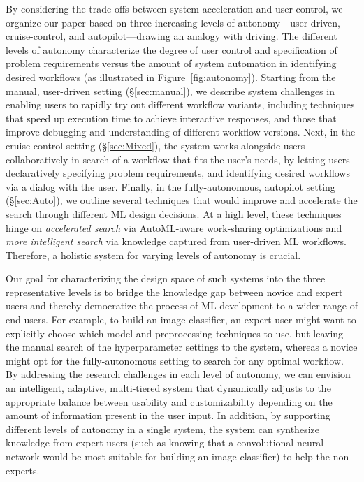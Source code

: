 \documentclass[11pt,dvipdfmx]{article}
\begin{document}
By considering the trade-offs between system acceleration and user control, we
organize our paper based on three increasing levels of autonomy---user-driven, cruise-control, and autopilot---drawing an analogy with driving. The different levels of autonomy
characterize the degree of user control and specification of problem
requirements versus the amount of system automation in identifying desired workflows (as
illustrated in Figure~\ref{fig:autonomy}). Starting from the manual, user-driven
setting (\S\ref{sec:manual}), we describe system challenges in enabling users
to rapidly try out different workflow variants, including
techniques that speed up execution time to achieve interactive responses, and
those that improve debugging and understanding of different workflow
versions. Next, in the cruise-control setting (\S\ref{sec:Mixed}), the
system works alongside users collaboratively in search of a workflow that
fits the user's needs, by letting users declaratively specifying problem requirements, and identifying desired workflows via a dialog with the user. Finally, in
the fully-autonomous, autopilot setting (\S\ref{sec:Auto}), we outline several techniques
that would improve and accelerate the search through different ML design
decisions. At a high level, these techniques hinge on {\em accelerated search}
via AutoML-aware work-sharing optimizations and {\em more intelligent search}
via knowledge captured from user-driven ML workflows.
Therefore, a holistic system for varying levels of autonomy is crucial. 
\par Our goal for characterizing the design space of such systems into the three representative levels is to bridge the knowledge gap between novice and expert users and thereby democratize the process of ML development to a wider range of end-users. For example, to build an image classifier, an expert user might want to explicitly choose which model and preprocessing techniques to use, but leaving the manual search of the hyperparameter settings to the system, whereas a novice might opt for the fully-autonomous setting to search for any optimal workflow. By addressing the research challenges in each level of autonomy, we can envision an intelligent, adaptive, multi-tiered system that dynamically adjusts to the appropriate balance between usability and customizability depending on the amount of information present in the user input. In addition, by supporting different levels of autonomy in a single system, the system can synthesize knowledge from expert users (such as knowing that a convolutional neural network would be most suitable for building an image classifier) to help the non-experts.
\end{document}
